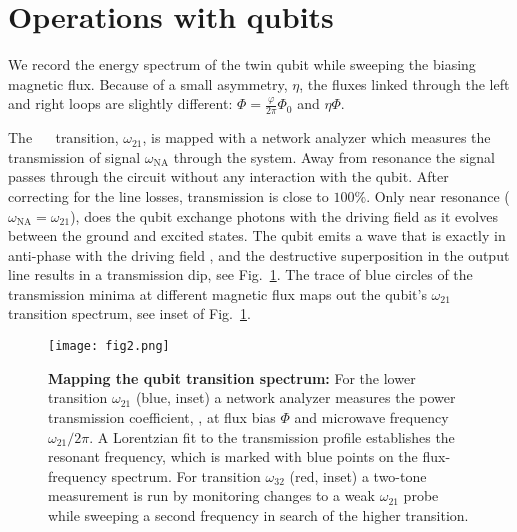 
\section{Operations with qubits}
\label{sec:characterisation}


\noindent We record the energy spectrum of  the twin qubit while sweeping the biasing magnetic
flux.  Because of a  small asymmetry, $\eta$, the fluxes linked through the  left and right loops
are slightly different: $ \Phi = \frac{\varphi}{2\pi}\Phi_0$ and $ \eta\Phi $.

The  ~\ilra~ transition,  $\omega_{21}$, is  mapped with  a network  analyzer which
measures the transmission  of signal $\omega_{\text{NA}}$ through the system.   Away from resonance
the  signal  passes  through the  circuit  without  any  interaction  with the  qubit.   After
correcting for  the line  losses, transmission  is close to  $ 100\%  $.  Only  near resonance
($\omega_{\text{NA}}=\omega_{21}$), does the qubit exchange photons with the driving field as it evolves
between the ground and  excited states.  The qubit emits a wave that  is exactly in anti-phase
with the driving field \cite{abdumalikov2010}, and the destructive superposition in the output
line  results in  a  transmission dip,  see Fig.~\ref{fig:transmission}.   The  trace of  blue
circles  of  the  transmission  minima  at  different  magnetic  flux  maps  out  the  qubit's
$\omega_{21}$ transition spectrum, see inset of Fig.~\ref{fig:transmission}.

\begin{figure}[h]
  \centering \texttt{[image: fig2.png]}
  \caption{\small \textbf{Mapping  the qubit transition  spectrum:}  For the  lower transition
    $\omega_{21}$ (blue,  inset) a  network analyzer measures  the power  transmission coefficient,
    , at flux  bias $ \Phi $  and microwave frequency $  \omega_{21}/2\pi$.  A Lorentzian
    fit \cite{Astafiev2010}  to the transmission  profile establishes the  resonant frequency,
    which  is  marked  with  blue  points on  the  flux-frequency  spectrum.   For  transition
    $\omega_{32}$  (red, inset)  a two-tone  measurement is  run by  monitoring changes  to a  weak
    $\omega_{21}$ probe while sweeping a second frequency  in search of the higher transition.
  }
  \label{fig:transmission}
\end{figure}

